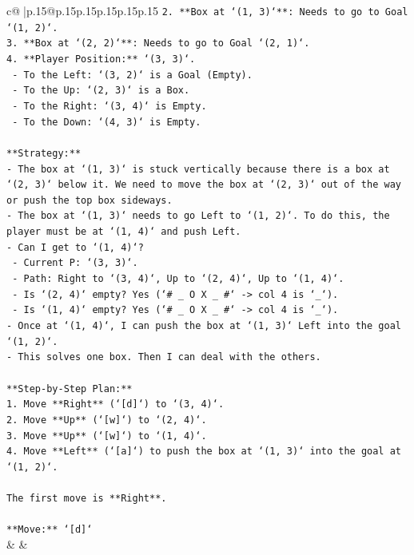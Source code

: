 \documentclass{article}
\begin{document}
{\begin{supertabular}{c@{$\;$}|p{.15\linewidth}@{}p{.15\linewidth}p{.15\linewidth}p{.15\linewidth}p{.15\linewidth}p{.15\linewidth}}
{{{\texttt{2.  **Box at `(1, 3)`**: Needs to go to Goal `(1, 2)`.} \\
\texttt{3.  **Box at `(2, 2)`**: Needs to go to Goal `(2, 1)`.} \\
\texttt{4.  **Player Position:** `(3, 3)`.} \\
\texttt{    {-} To the Left: `(3, 2)` is a Goal (Empty).} \\
\texttt{    {-} To the Up: `(2, 3)` is a Box.} \\
\texttt{    {-} To the Right: `(3, 4)` is Empty.} \\
\texttt{    {-} To the Down: `(4, 3)` is Empty.} \\
\\ 
\texttt{**Strategy:**} \\
\texttt{{-} The box at `(1, 3)` is stuck vertically because there is a box at `(2, 3)` below it. We need to move the box at `(2, 3)` out of the way or push the top box sideways.} \\
\texttt{{-} The box at `(1, 3)` needs to go Left to `(1, 2)`. To do this, the player must be at `(1, 4)` and push Left.} \\
\texttt{{-} Can I get to `(1, 4)`?} \\
\texttt{  {-} Current P: `(3, 3)`.} \\
\texttt{  {-} Path: Right to `(3, 4)`, Up to `(2, 4)`, Up to `(1, 4)`.} \\
\texttt{  {-} Is `(2, 4)` empty? Yes (`\# \_ O X \_ \#` {-}> col 4 is `\_`).} \\
\texttt{  {-} Is `(1, 4)` empty? Yes (`\# \_ O X \_ \#` {-}> col 4 is `\_`).} \\
\texttt{{-} Once at `(1, 4)`, I can push the box at `(1, 3)` Left into the goal `(1, 2)`.} \\
\texttt{{-} This solves one box. Then I can deal with the others.} \\
\\ 
\texttt{**Step{-}by{-}Step Plan:**} \\
\texttt{1.  Move **Right** (`{[}d{]}`) to `(3, 4)`.} \\
\texttt{2.  Move **Up** (`{[}w{]}`) to `(2, 4)`.} \\
\texttt{3.  Move **Up** (`{[}w{]}`) to `(1, 4)`.} \\
\texttt{4.  Move **Left** (`{[}a{]}`) to push the box at `(1, 3)` into the goal at `(1, 2)`.} \\
\\ 
\texttt{The first move is **Right**.} \\
\\ 
\texttt{**Move:** `{[}d{]}`} \\
            }
        }
    }
    & & \\ \\


\end{supertabular}}
\end{document}
